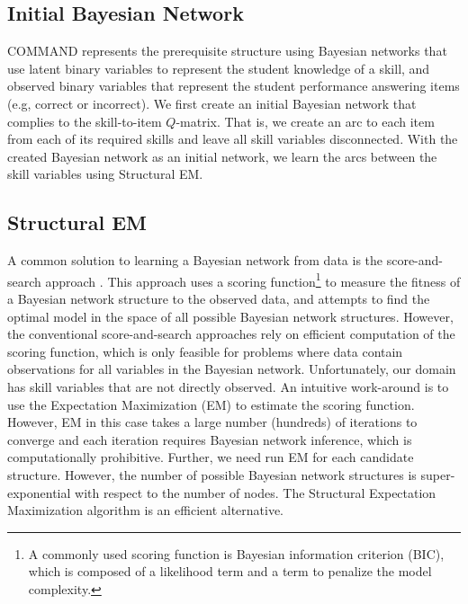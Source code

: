 \documentclass{edm_template}
\begin{document}
\subsection{Initial Bayesian Network}
\label{sec:initial_bn}
COMMAND represents the prerequisite structure using Bayesian networks that use latent binary variables to represent the student knowledge of a skill, 
and observed binary variables that represent the student performance answering items (e.g, correct or incorrect).
We first create an initial Bayesian network that complies to the skill-to-item $Q$-matrix.
That is, we create an arc to each item from each of its required skills and leave all skill variables disconnected.
With the created Bayesian network as an initial network, we learn the arcs between the skill variables using Structural EM.

\subsection{Structural EM}
\label{sec:sem}

A common solution to learning a Bayesian network from data is the score-and-search approach \cite{cooper1992bayesian,heckerman1997bayesian}.
This approach uses a scoring function\footnote{A commonly used scoring function is Bayesian information criterion (BIC), which is composed of a likelihood term and a term to penalize the model complexity.} to measure the fitness of a Bayesian network structure to the observed data, 
and attempts to find the optimal model in the space of all possible Bayesian network structures.
However, the conventional score-and-search approaches rely on efficient computation of the scoring function, 
which is only feasible for problems where data contain observations for all variables in the Bayesian network.
Unfortunately, our domain has skill variables that are not directly observed.
An intuitive work-around is to use the Expectation Maximization (EM) to estimate the scoring function.
However, EM in this case takes a large number (hundreds) of iterations to converge and each iteration requires Bayesian network inference, 
which is computationally prohibitive.
Further, we need run EM for each candidate structure. However, the number of possible Bayesian network structures is super-exponential with respect to the number of nodes.
The Structural Expectation Maximization algorithm \cite{friedman1997learning} is an efficient alternative.
\end{document}
